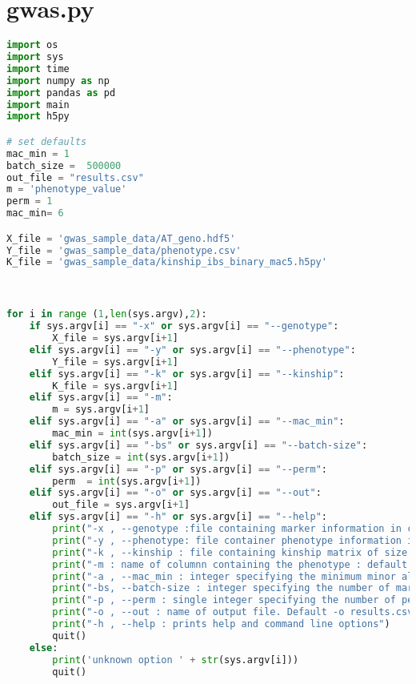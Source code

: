 \section{gwas.py}
\begin{lstlisting}[language=Python]
import os
import sys
import time
import numpy as np
import pandas as pd
import main
import h5py

# set defaults 
mac_min = 1
batch_size =  500000 
out_file = "results.csv"
m = 'phenotype_value'
perm = 1
mac_min= 6

X_file = 'gwas_sample_data/AT_geno.hdf5'
Y_file = 'gwas_sample_data/phenotype.csv'
K_file = 'gwas_sample_data/kinship_ibs_binary_mac5.h5py'



for i in range (1,len(sys.argv),2):
    if sys.argv[i] == "-x" or sys.argv[i] == "--genotype":
        X_file = sys.argv[i+1]
    elif sys.argv[i] == "-y" or sys.argv[i] == "--phenotype":
        Y_file = sys.argv[i+1]
    elif sys.argv[i] == "-k" or sys.argv[i] == "--kinship":
        K_file = sys.argv[i+1]
    elif sys.argv[i] == "-m":
        m = sys.argv[i+1]
    elif sys.argv[i] == "-a" or sys.argv[i] == "--mac_min":
        mac_min = int(sys.argv[i+1])
    elif sys.argv[i] == "-bs" or sys.argv[i] == "--batch-size":
        batch_size = int(sys.argv[i+1])
    elif sys.argv[i] == "-p" or sys.argv[i] == "--perm":
        perm  = int(sys.argv[i+1])
    elif sys.argv[i] == "-o" or sys.argv[i] == "--out":
        out_file = sys.argv[i+1]
    elif sys.argv[i] == "-h" or sys.argv[i] == "--help":
        print("-x , --genotype :file containing marker information in csv or hdf5 format of size")
        print("-y , --phenotype: file container phenotype information in csv format"  )
        print("-k , --kinship : file containing kinship matrix of size k X k in csv or hdf5 format")
        print("-m : name of columnn containing the phenotype : default m = phenotype_value")
        print("-a , --mac_min : integer specifying the minimum minor allele count necessary for a marker to be included. Default a = 1" )
        print("-bs, --batch-size : integer specifying the number of markers processed at once. Default -bs 500000" )
        print("-p , --perm : single integer specifying the number of permutations. Default 1 == no perm ")
        print("-o , --out : name of output file. Default -o results.csv  ")
        print("-h , --help : prints help and command line options")
        quit()
    else:
        print('unknown option ' + str(sys.argv[i]))
        quit()




\end{lstlisting}
